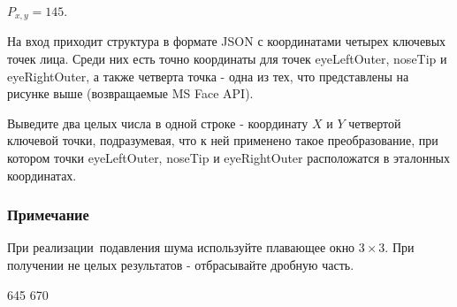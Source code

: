 $P_{x,y}=145$.


На вход приходит структура в формате JSON с координатами четырех ключевых точек лица. Среди них есть точно координаты для точек eyeLeftOuter, noseTip и eyeRightOuter, а также четверта точка - одна из тех, что представлены на рисунке выше (возвращаемые MS Face API).

\outputfmtSection

Выведите два целых числа в одной строке - координату $X$ и $Y$ четвертой ключевой точки, подразумевая, что к ней применено такое преобразование, при котором точки eyeLeftOuter, noseTip и eyeRightOuter расположатся в эталонных координатах.

\subsubsection*{Примечание}

При реализации подавления шума используйте плавающее окно $3 \times 3$. При получении не целых результатов - отбрасывайте дробную часть.

\begin{myverbbox}[\small]{\vinput} 
    [{"faceLandmarks": {"eyeLeftOuter": {"x": 224.1, "y": 199.0}, ...]
\end{myverbbox}
\begin{myverbbox}[\small]{\voutput}
    645 670
\end{myverbbox}

